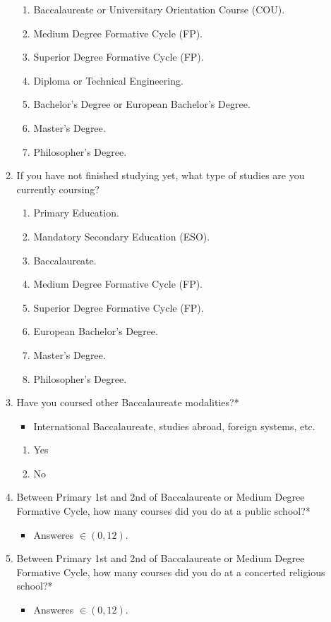 \documentclass[12pt]{article}
\begin{document}
\begin{enumerate}
\begin{enumerate}
\begin{enumerate}
\item Baccalaureate or Universitary Orientation Course (COU).
\item Medium Degree Formative Cycle (FP).
\item Superior Degree Formative Cycle (FP).
\item Diploma or Technical Engineering.
\item Bachelor's Degree or European Bachelor's Degree.
\item Master's Degree.
\item Philosopher's Degree.
\end{enumerate}
\item If you have not finished studying yet, what type of studies are you currently coursing?
\begin{enumerate}
\item Primary Education.
\item Mandatory Secondary Education (ESO).
\item Baccalaureate.
\item Medium Degree Formative Cycle (FP).
\item Superior Degree Formative Cycle (FP).
\item European Bachelor's Degree.
\item Master's Degree.
\item Philosopher's Degree.
\end{enumerate}
\item Have you coursed other Baccalaureate modalities?*
\begin{itemize}
\item International Baccalaureate, studies abroad, foreign systems, etc.
\end{itemize}
\begin{enumerate}
\item Yes
\item No
\end{enumerate}
\item Between Primary 1st and 2nd of Baccalaureate or Medium Degree Formative Cycle, how many courses did you do at a public school?*
\begin{itemize}
\item Answeres $\in (0, 12)$.
\end{itemize}
\item Between Primary 1st and 2nd of Baccalaureate or Medium Degree Formative Cycle, how many courses did you do at a concerted religious school?*
\begin{itemize}
\item Answeres $\in (0, 12)$.

\end{itemize}
\end{enumerate}
\end{enumerate}
\end{document}

